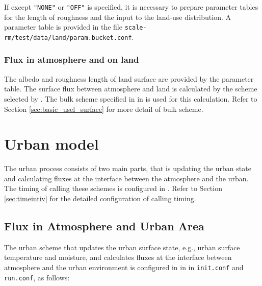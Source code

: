 If  except \verb|"NONE"| or \verb|"OFF"| is specified,
it is necessary to prepare parameter tables for the length of roughness and the input to the land-use distribution.
A parameter table is provided
in the file \verb|scale-rm/test/data/land/param.bucket.conf|.\\

\subsubsection{Flux in atmosphere and on land}
The albedo and roughness length of land surface are provided by the parameter table. The surface flux between atmosphere and land is calculated by the scheme selected by . The bulk scheme specified in  in  is used for this calculation. Refer to Section \ref{sec:basic_usel_surface} for more detail of bulk scheme.



\section{Urban model} \label{sec:basic_usel_urban}
The urban process consists of two main parts, that is updating the urban state and calculating fluxes at the interface between the atmosphere and the urban.
The timing of calling these schemes is configured in . Refer to Section \ref{sec:timeintiv} for the detailed configuration of calling timing.

\subsection{Flux in Atmosphere and Urban Area}

The urban scheme that updates the urban surface state, e.g., urban surface temperature and moisture, and calculates fluxes at the interface between atmosphere and the urban environment is configured in  in  in \verb|init.conf| and \verb|run.conf|, as follows:
%

